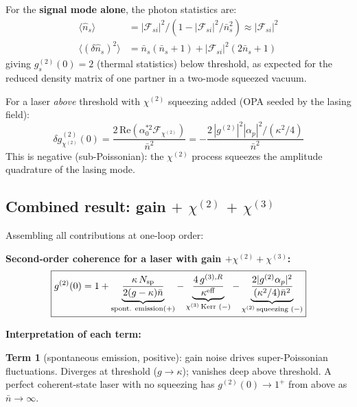 \documentclass[12pt]{article}
\begin{document}
For the \textbf{signal mode alone}, the photon statistics are:
\begin{align}
  \langle\hat{n}_s\rangle &= |\mathcal{F}_{si}|^2/(1-|\mathcal{F}_{si}|^2/\bar{n}_s^2)
  \approx |\mathcal{F}_{si}|^2
  \label{eq:ns_OPA}\\
  \langle(\delta\hat{n}_s)^2\rangle &=
  \bar{n}_s(\bar{n}_s+1) + |\mathcal{F}_{si}|^2(2\bar{n}_s+1)
  \label{eq:var_ns_OPA}
\end{align}
giving $g^{(2)}_s(0) = 2$ (thermal statistics) below threshold, as expected for
the reduced density matrix of one partner in a two-mode squeezed vacuum.

For a laser \emph{above} threshold with $\chi^{(2)}$ squeezing added
(OPA seeded by the lasing field):
\begin{equation}
  \delta g^{(2)}_{\chi^{(2)}}(0) =
  \frac{2\,\mathrm{Re}(\alpha_0^{*2}\mathcal{F}_{\chi^{(2)}})}{\bar{n}^2}
  = -\frac{2\,|g^{(2)}|^2|\alpha_p|^2/(\kappa^2/4)}{\bar{n}^2}
  \label{eq:g2_chi2}
\end{equation}
This is negative (sub-Poissonian): the $\chi^{(2)}$ process squeezes the
amplitude quadrature of the lasing mode.

\subsection{Combined result: gain $+$ $\chi^{(2)}$ $+$ $\chi^{(3)}$}
\label{sec:g2_combined}

Assembling all contributions at one-loop order:

\begin{keyresult}
\textbf{Second-order coherence for a laser with gain $+\chi^{(2)}+\chi^{(3)}$:}
\begin{equation}
  \boxed{
  g^{(2)}(0) =
  1
  + \underbrace{\frac{\kappa\,N_{\rm sp}}{2(g-\kappa)\bar{n}}}_{\text{spont. emission}(+)}
  - \underbrace{\frac{4\,g^{(3),R}}{\kappa^{\rm eff}}}_{\chi^{(3)}\,\text{Kerr }(-)}
  - \underbrace{\frac{2|g^{(2)}\alpha_p|^2}{(\kappa^2/4)\bar{n}^2}}_{\chi^{(2)}\,\text{squeezing }(-)}
  }
  \label{eq:g2_combined}
\end{equation}
\end{keyresult}

\textbf{Interpretation of each term:}

\textbf{Term 1} (spontaneous emission, positive): gain noise drives
super-Poissonian fluctuations.  Diverges at threshold ($g\to\kappa$);
vanishes deep above threshold.  A perfect coherent-state laser with no
squeezing has $g^{(2)}(0)\to 1^+$ from above as $\bar{n}\to\infty$.
\end{document}
